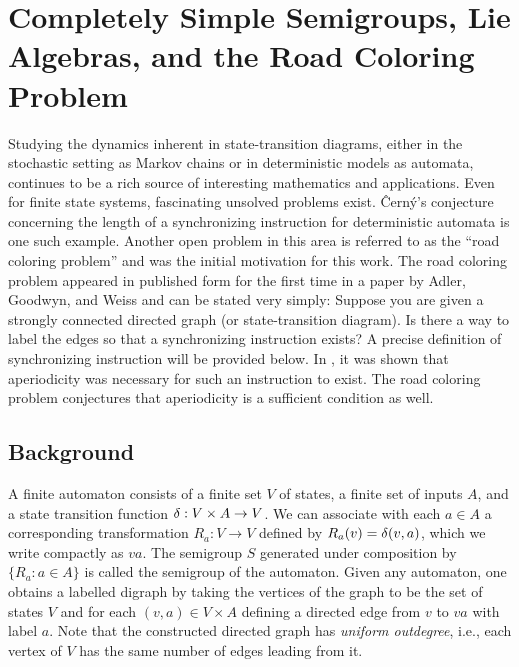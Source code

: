 






\section{Completely Simple Semigroups, Lie Algebras, 
  and the Road Coloring Problem }
\label{sec:4.8}

Studying the dynamics inherent in state-transition diagrams, either in the stochastic setting as Markov chains or in deterministic models as automata, continues to be a rich source of interesting mathematics and applications. 
Even for finite state systems, fascinating unsolved problems exist.
\^Cern\'y's conjecture concerning the length of a synchronizing instruction for deterministic automata is one such example. 
Another open problem in this area is referred to as the ``road coloring problem'' and was the initial motivation for this work. 
The road coloring problem appeared in published form for the first time in a paper by Adler, Goodwyn, and Weiss \cite{AGW} and can be stated very simply:  Suppose you are given a strongly connected directed graph (or state-transition diagram).  
Is there a way to label the edges so that a synchronizing  instruction exists? 
A precise definition of synchronizing instruction will be provided below. 
In \cite{AGW},  it was shown that aperiodicity was necessary for such an instruction to exist. 
The road coloring problem conjectures that aperiodicity is a sufficient condition as well. 

\subsection{Background} 
\label{sec:4.8.1}

A finite automaton consists of a finite set $V$ of states, a finite set of inputs $A$, and a state transition function $\delta :V\times A \to V$.
We can associate with each $a \in A$ a corresponding transformation $R_a: V \to V$ defined by $R_a(v) = \delta(v,a)$, which we write compactly as $va$.
The semigroup $S$ generated under composition by $\{R_a: a \in A\}$ is called the semigroup of the automaton.
Given any automaton, one obtains a labelled digraph by taking the vertices of the graph to be the set of states $V$ and for each $(v,a) \in V \times A$ defining a directed edge from $v$ to $va$ with label $a$.  
Note that the constructed directed graph has \textit{uniform outdegree}, i.e., each vertex of $V$ has the same number of edges leading from it.


